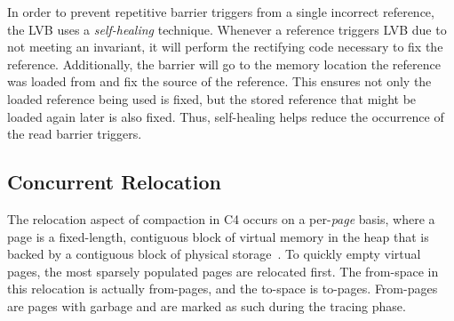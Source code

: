 \documentclass{sig-alternate}
\begin{document}
In order to prevent repetitive barrier triggers from a single incorrect reference,
the LVB uses a \emph{self-healing} technique. Whenever a reference triggers LVB
due to not meeting an invariant, it will perform the rectifying code
necessary to fix the reference. Additionally, the barrier will go to the memory
location the reference was loaded from and fix the source of the reference. This
ensures not only the loaded reference being used is fixed, but the stored reference
that might be loaded again later is also fixed.
Thus, self-healing helps reduce the occurrence of the read barrier triggers.


\subsection{Concurrent Relocation}
\label{sec:c4Relocation}

The relocation aspect of compaction in C4 occurs on a per-\emph{page}
basis, where a page is a fixed-length, contiguous block of virtual memory in the heap
that is backed by a contiguous block of physical storage~\cite{wiki:page}\cite{Tene:C4}.
To quickly empty virtual pages, the most sparsely populated pages are relocated
first. The from-space in this relocation is actually from-pages, and the to-space
is to-pages. From-pages are pages with garbage
and are marked as such during the tracing phase.
\end{document}
